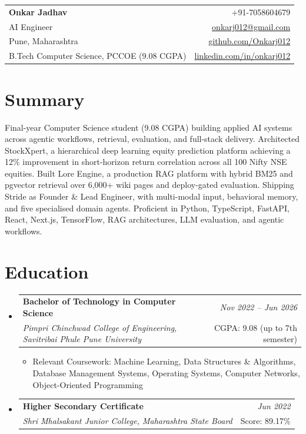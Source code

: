 \documentclass[a4paper,11pt]{article}
\makeatletter
\newcommand{\resumeSubheading}[4]{
\vspace{0.5mm}\item
    \begin{tabular*}{0.98\textwidth}[t]{l@{\extracolsep{\fill}}r}
        \textbf{#1} & \textit{\footnotesize{#4}} \\
        \textit{\footnotesize{#3}} & \footnotesize{#2}\\
    \end{tabular*}
    \vspace{-2.4mm}
}
\newcommand{\resumeSubHeadingListStart}{\begin{itemize}[leftmargin=*,labelsep=0mm]}
\newcommand{\resumeItemListStart}{\begin{justify}\begin{itemize}[leftmargin=3ex, rightmargin=2ex, noitemsep,labelsep=1.2mm,itemsep=0mm]\small}
\newcommand{\resumeSubHeadingListEnd}{\end{itemize}\vspace{2mm}}
\newcommand{\resumeItemListEnd}{\end{itemize}\end{justify}\vspace{-2mm}}
\newcommand{\name}{Onkar Jadhav}
\newcommand{\phone}{7058604679}
\newcommand{\emaila}{onkarj012@gmail.com}
\newcommand{\github}{github.com/Onkarj012}
\newcommand{\linkedin}{linkedin.com/in/onkarj012}
\makeatother
\begin{document}
\begin{tabularx}{\linewidth}{L r}
  \textbf{\Large \name} & {+91-\phone} \\
  {AI Engineer} & \href{mailto:\emaila}{\emaila} \\
  {Pune, Maharashtra} & \href{https://\github}{\github} \\
  {B.Tech Computer Science, PCCOE (9.08 CGPA)} & \href{https://\linkedin}{\linkedin}
\end{tabularx}
\vspace{-4mm}

\section{\textbf{Summary}}
\vspace{1mm}
\small{
Final-year Computer Science student (9.08 CGPA) building applied AI systems across agentic workflows, retrieval, evaluation, and full-stack delivery. Architected StockXpert, a hierarchical deep learning equity prediction platform achieving a 12\% improvement in short-horizon return correlation across all 100 Nifty NSE equities. Built Lore Engine, a production RAG platform with hybrid BM25 and pgvector retrieval over 6,000+ wiki pages and deploy-gated evaluation. Shipping Stride as Founder \& Lead Engineer, with multi-modal input, behavioral memory, and five specialised domain agents. Proficient in Python, TypeScript, FastAPI, React, Next.js, TensorFlow, RAG architectures, LLM evaluation, and agentic workflows.
}
\vspace{-3mm}

\section{\textbf{Education}}
  \resumeSubHeadingListStart
    \resumeSubheading
      {Bachelor of Technology in Computer Science}{CGPA: 9.08 (up to 7th semester)}
      {Pimpri Chinchwad College of Engineering, Savitribai Phule Pune University}{Nov 2022 -- Jun 2026}
      \resumeItemListStart
        \item {Relevant Coursework: Machine Learning, Data Structures \& Algorithms, Database Management Systems, Operating Systems, Computer Networks, Object-Oriented Programming}
      \resumeItemListEnd
    \resumeSubheading
      {Higher Secondary Certificate}{Score: 89.17\%}
      {Shri Mhalsakant Junior College, Maharashtra State Board}{Jun 2022}
  \resumeSubHeadingListEnd
\vspace{-5.5mm}
\end{document}
